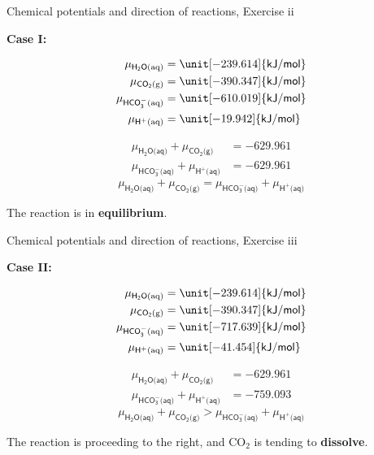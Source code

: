 %
\begin{frame}{Chemical potentials and direction of reactions, Exercise \; ii}

\textbf{Case I: }

\lcol
\begin{align*}
\mu_{\mathsf{H_{2}O\text{(aq)}}} & =\unit[-239.614]{\mathsf{kJ/mol}}\\
\mu_{\mathsf{CO_{2}\text{(g)}}} & =\unit[-390.347]{\mathsf{kJ/mol}}\\
\mu_{\mathsf{HCO_{3}^{-}\text{(aq)}}} & =\unit[-610.019]{\mathsf{kJ/mol}}\\
\mu_{\mathsf{H^{+}\text{(aq)}}} & =\unit[-19.942]{\mathsf{kJ/mol}}
\end{align*}
\rcol

\begin{align*}
\mu_{\mathsf{H_{2}O\text{(aq)}}}+\mu_{\mathsf{CO_{2}\text{(g)}}} & =-629.961\\
\mu_{\mathsf{HCO_{3}^{-}\text{(aq)}}}+\mu_{\mathsf{H^{+}\text{(aq)}}} & =-629.961
\end{align*}
\[
\boxed{\mu_{\mathsf{H_{2}O\text{(aq)}}}+\mu_{\mathsf{CO_{2}\text{(g)}}}=\mu_{\mathsf{HCO_{3}^{-}\text{(aq)}}}+\mu_{\mathsf{H^{+}\text{(aq)}}}}
\]

The reaction is in \textbf{equilibrium}.

\ecol
\end{frame}
%
%
\begin{frame}{Chemical potentials and direction of reactions, Exercise \; iii}

\textbf{Case II: }

\lcol
\begin{align*}
\mu_{\mathsf{H_{2}O\text{(aq)}}} & =\unit[-239.614]{\mathsf{kJ/mol}}\\
\mu_{\mathsf{CO_{2}\text{(g)}}} & =\unit[-390.347]{\mathsf{kJ/mol}}\\
\mu_{\mathsf{HCO_{3}^{-}\text{(aq)}}} & =\unit[-717.639]{\mathsf{kJ/mol}}\\
\mu_{\mathsf{H^{+}\text{(aq)}}} & =\unit[-41.454]{\mathsf{kJ/mol}}
\end{align*}
\rcol

\begin{align*}
\mu_{\mathsf{H_{2}O\text{(aq)}}}+\mu_{\mathsf{CO_{2}\text{(g)}}} & =-629.961\\
\mu_{\mathsf{HCO_{3}^{-}\text{(aq)}}}+\mu_{\mathsf{H^{+}\text{(aq)}}} & =-759.093
\end{align*}
\[
\boxed{\mu_{\mathsf{H_{2}O\text{(aq)}}}+\mu_{\mathsf{CO_{2}\text{(g)}}}>\mu_{\mathsf{HCO_{3}^{-}\text{(aq)}}}+\mu_{\mathsf{H^{+}\text{(aq)}}}}
\]

The reaction is proceeding to the right, and CO$_{2}$ is tending
to \textbf{dissolve}.

\ecol
\end{frame}
